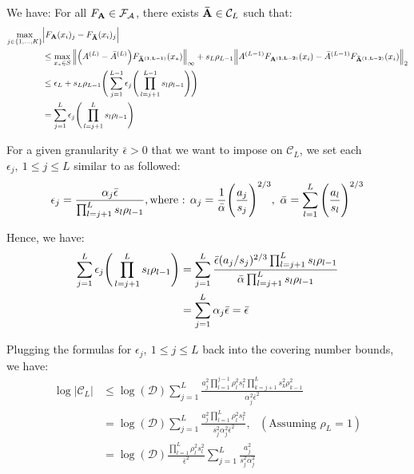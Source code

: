 \noindent We have: For all $F_{\bf A}\in\mathcal{F}_\mathcal{A}$, there exists ${\bf \bar A}\in\mathcal{C}_L$ such that:
\begin{align*}
    \max_{j\in\{1, \dots, K\}} &\Big| 
        F_{\bf A}(x_i)_j - F_{\bf \bar A}(x_i)_j
     \Big| \\
    &\le \max_{x_*\in S}\Big\|
        \Big( A^{(L)}-{\bar A}^{(L)} \Big)F_{\bf {\bar A}^{(1, L-1)}}(x_*)
    \Big\|_\infty + s_L\rho_{L-1} \Big\|
        A^{(L-1)}F_{\bf A^{(1, L-2)}}(x_i) - {\bar A}^{(L-1)}F_{\bf {\bar A}^{(1, L-2)}}(x_i) 
    \Big\|_2 \\ 
    &\le \epsilon_L + s_L\rho_{L-1}\Bigg( 
        \sum_{j=1}^{L-1}\epsilon_j\Bigg( 
            \prod_{l=j+1}^{L-1}s_l\rho_{l-1}
         \Bigg)
     \Bigg) \\
    &=\sum_{j=1}^L \epsilon_j\Bigg( \prod_{l=j+1}^L s_l\rho_{l-1} \Bigg)
\end{align*}

\noindent For a given granularity $\bar \epsilon > 0$ that we want to impose on $\mathcal{C}_L$, we set each $\epsilon_j, \ 1 \le j \le L$ similar to \cite{article:bartlett} as followed:
\begin{align*}
    \epsilon_j = \frac{\alpha_j\bar\epsilon}{\prod_{l=j+1}^L s_l\rho_{l-1}}, \text{where : } \alpha_j = \frac{1}{\bar\alpha}\biggRound{\frac{a_j}{s_j}}^{2/3}, \ \bar\alpha=\sum_{l=1}^L \biggRound{\frac{a_l}{s_l}}^{2/3}
\end{align*}

\noindent Hence, we have:
\begin{align*}
    \sum_{j=1}^L \epsilon_j\Bigg( 
        \prod_{l=j+1}^L s_l\rho_{l-1}
     \Bigg) &= \sum_{j=1}^L \frac{\bar\epsilon(a_j/s_j)^{2/3}\prod_{l=j+1}^L s_l\rho_{l-1}}{\bar\alpha\prod_{l=j+1}^Ls_l\rho_{l-1}} \\
    &= \sum_{j=1}^L\alpha_j\bar\epsilon = \bar\epsilon
\end{align*}

\noindent Plugging the formulas for $\epsilon_j, \ 1\le j \le L$ back into the covering number bounds, we have:
\begin{align*}
    \log|\mathcal{C}_L| &\le \log(\mathcal{D})\sum_{j=1}^L \frac{a_j^2\prod_{l=1}^{j-1}\rho_l^2s_l^2\prod_{k=j+1}^L s_k^2\rho_{k-1}^2}{\alpha_j^2\bar\epsilon^2} \\
        &= \log(\mathcal{D})\sum_{j=1}^L \frac{a_j^2\prod_{l=1}^L \rho_l^2s_l^2}{s_j^2\alpha_j^2\bar\epsilon^2}, \ \ \ (\text{Assuming }\rho_L=1) \\
        &= \log(\mathcal{D})\frac{\prod_{l=1}^L \rho_l^2s_l^2}{\bar\epsilon^2}\sum_{j=1}^L \frac{a_j^2}{s_j^2\alpha_j^2}
\end{align*}


